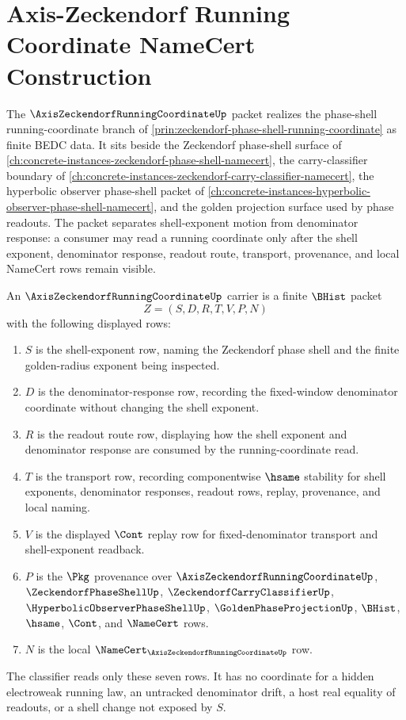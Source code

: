 \chapter{Axis-Zeckendorf Running Coordinate NameCert Construction}
\label{ch:concrete-instances-axis-zeckendorf-running-coordinate-namecert}

The $\AxisZeckendorfRunningCoordinateUp$ packet realizes the phase-shell running-coordinate branch of \autoref{prin:zeckendorf-phase-shell-running-coordinate} as finite BEDC data. It sits beside the Zeckendorf phase-shell surface of \autoref{ch:concrete-instances-zeckendorf-phase-shell-namecert}, the carry-classifier boundary of \autoref{ch:concrete-instances-zeckendorf-carry-classifier-namecert}, the hyperbolic observer phase-shell packet of \autoref{ch:concrete-instances-hyperbolic-observer-phase-shell-namecert}, and the golden projection surface used by phase readouts. The packet separates shell-exponent motion from denominator response: a consumer may read a running coordinate only after the shell exponent, denominator response, readout route, transport, provenance, and local NameCert rows remain visible.

\begin{definition}
\label{def:axis-zeckendorf-running-coordinate-carrier}
An $\AxisZeckendorfRunningCoordinateUp$ carrier is a finite $\BHist$ packet
$$
Z=(S,D,R,T,V,P,N)
$$
with the following displayed rows:
\begin{enumerate}
\item $S$ is the shell-exponent row, naming the Zeckendorf phase shell and the finite golden-radius exponent being inspected.
\item $D$ is the denominator-response row, recording the fixed-window denominator coordinate without changing the shell exponent.
\item $R$ is the readout route row, displaying how the shell exponent and denominator response are consumed by the running-coordinate read.
\item $T$ is the transport row, recording componentwise $\hsame$ stability for shell exponents, denominator responses, readout rows, replay, provenance, and local naming.
\item $V$ is the displayed $\Cont$ replay row for fixed-denominator transport and shell-exponent readback.
\item $P$ is the $\Pkg$ provenance over $\AxisZeckendorfRunningCoordinateUp$, $\ZeckendorfPhaseShellUp$, $\ZeckendorfCarryClassifierUp$, $\HyperbolicObserverPhaseShellUp$, $\GoldenPhaseProjectionUp$, $\BHist$, $\hsame$, $\Cont$, and $\NameCert$ rows.
\item $N$ is the local $\NameCert_{\AxisZeckendorfRunningCoordinateUp}$ row.
\end{enumerate}
The classifier reads only these seven rows. It has no coordinate for a hidden electroweak running law, an untracked denominator drift, a host real equality of readouts, or a shell change not exposed by $S$.
\end{definition}

